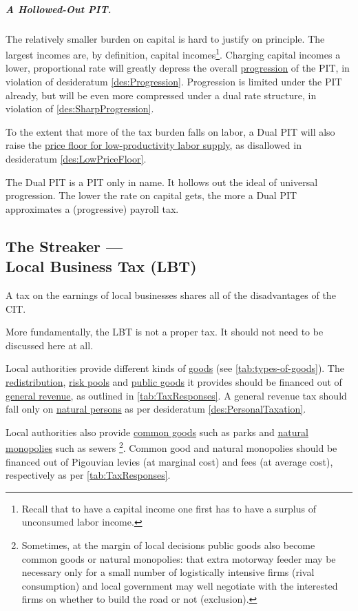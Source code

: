\subparagraph{A Hollowed-Out PIT.} The relatively smaller burden on capital is hard to justify on principle. The largest incomes are, by definition, capital incomes\footnote{
	Recall that to have a capital income one first has to have a surplus of unconsumed labor income.}. 
Charging capital incomes a lower, proportional rate will greatly depress the overall \hyperref[des:Progression]{progression} of the PIT, in violation of desideratum \ref{des:Progression}. Progression is limited under the PIT already, but will be even more compressed under a dual rate structure, in violation of \ref{des:SharpProgression}.

To the extent that more of the tax burden falls on labor, a Dual PIT will also raise the \hyperref[des:LowPriceFloor]{price floor for low-productivity labor supply}, as disallowed in desideratum \ref{des:LowPriceFloor}. 

The Dual PIT is a PIT only in name. It hollows out the ideal of universal progression. %
The lower the rate on capital gets, the more a Dual PIT approximates a (progressive) payroll tax.

\subsection[Business Tax]{The Streaker ---\\Local Business Tax (LBT)} \label{sec:ScoreLBT} A tax on the earnings of local businesses shares all of the disadvantages of the CIT.

More fundamentally, the LBT is not a proper tax. It should not need to be discussed here at all. 

Local authorities provide different kinds of \hyperref[tab:types-of-goods]{goods} (see \autoref{tab:types-of-goods}). The \hyperref[sec:Redistribution]{redistribution}, \hyperref[sec:RiskPooling]{risk pools} and \hyperref[sec:PublicGood]{public goods} it provides should be financed out of \hyperref[tab:TaxResponses]{general revenue}, as outlined in \autoref{tab:TaxResponses}. A general revenue tax should fall only on \hyperref[des:PersonalTaxation]{natural persons} as per desideratum \ref{des:PersonalTaxation}. 

Local authorities also provide \hyperref[sec:CommonGood]{common goods} such as parks and \hyperref[sec:NaturalMonopolies]{natural monopolies} such as sewers \footnote{Sometimes, at the margin of local decisions public goods also become common goods or natural monopolies: that extra motorway feeder may be necessary only for a small number of logistically intensive firms (rival consumption) and local government may well negotiate with the interested firms on whether to build the road or not (exclusion).}. Common good and natural monopolies should be financed out of Pigouvian levies (at marginal cost) and fees (at average cost), respectively as per \autoref{tab:TaxResponses}.

